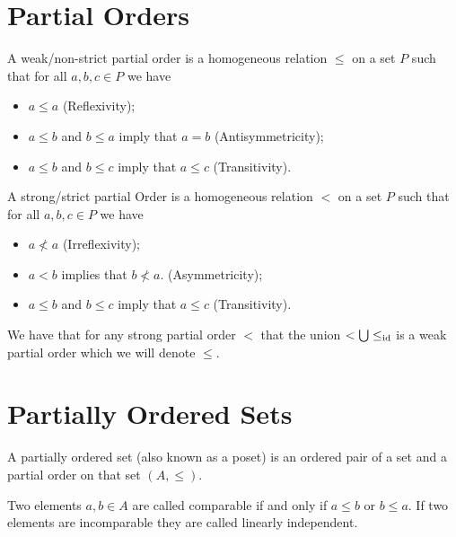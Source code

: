 \documentclass[11pt,a4paper]{article}
\begin{document}
\newpage

\section{Partial Orders}
\begin{definition}
	A weak/non-strict partial order is a homogeneous relation 
	$\le$ on a set $P$ such that for all $a,b,c \in P$ we have
\end{definition}
\begin{itemize}
	\item $a \le a$ (Reflexivity);
	\item $a \le b$ and  $b \le a$ imply that $a = b$ (Antisymmetricity);
	\item $a \le b$ and $b \le c$ imply that $a \le c$ (Transitivity).
	\end{itemize}
  \begin{definition}
	A strong/strict partial Order is a homogeneous relation 
	$<$ on a set $P$ such that for all $a,b,c \in P$ we have
\end{definition}
\begin{itemize}
\item $a \not < a$ (Irreflexivity);
\item $a < b$ implies that $b \not < a$. (Asymmetricity);
\item $a \le b$ and $b \le c$ imply that $a \le c$ (Transitivity).
\end{itemize}
\begin{remark}
	We have that for any strong partial order $<$ that the union 
  $< \bigcup \le_{\operatorname{id}}$ is a weak partial order which we will denote $\le$.
\end{remark}

\section{Partially Ordered Sets}
\begin{definition}
	A partially ordered set (also known as a poset) is an ordered
	pair of a set and a partial order on that set $(A, \le)$.
\end{definition}

\begin{definition}
	Two elements $a, b \in A$ are called comparable if and
	only if $a \le b$ or $b \le a$.
  If two elements are incomparable 
  they are called linearly independent.
\end{definition}
\end{document}
